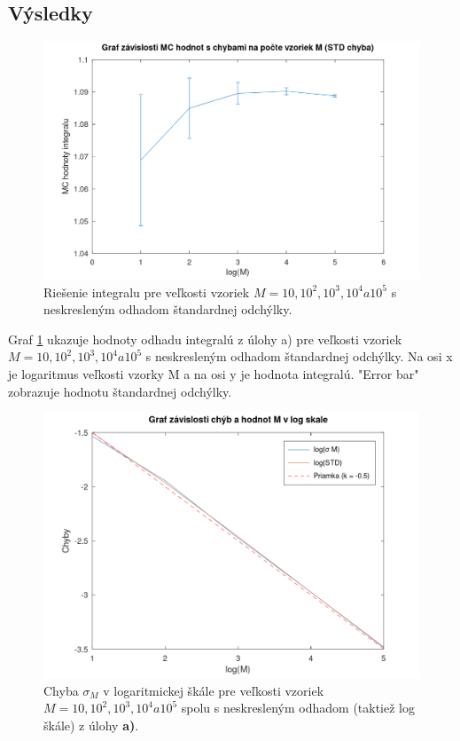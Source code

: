 \documentclass{article}
\theoremstyle{definition}
\theoremstyle{remark}
\begin{document}
\subsection{Výsledky}


\begin{figure}[H]
    \centering
    \includegraphics[width=1\textwidth]{hw4stdgraph.png}
    \caption{Riešenie integralu pre veľkosti vzoriek $M = 10, 10^2, 10^3, 10^4 a 10^5$ s neskresleným odhadom štandardnej odchýlky.}
    \label{fig:mc}
\end{figure}

Graf \ref{fig:mc} ukazuje hodnoty odhadu integralú z úlohy a) pre veľkosti vzoriek $M = 10, 10^2, 10^3, 10^4 a 10^5$ s neskresleným odhadom štandardnej odchýlky. Na osi x je logaritmus veľkosti vzorky M a na osi y je hodnota integralú. "Error bar" zobrazuje hodnotu štandardnej odchýlky.

\begin{figure}[H]
    \centering

    \includegraphics[width=1\textwidth]{hw4chyby.png}
    \caption{Chyba $\sigma_M$ v logaritmickej škále pre veľkosti vzoriek $M = 10, 10^2, 10^3, 10^4 a 10^5$ spolu s neskresleným odhadom (taktiež log škále) z úlohy \textbf{a)}.}
    \label{second}

\end{figure}
\end{document}
